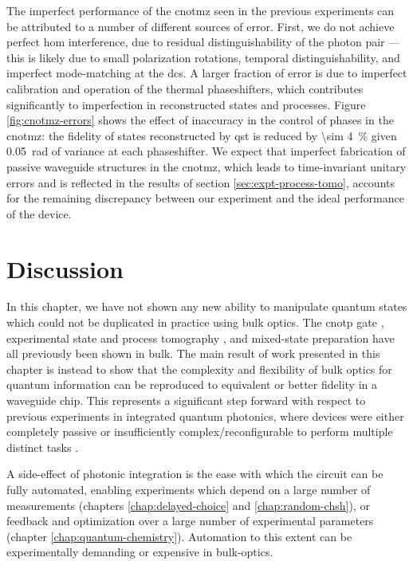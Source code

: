 The imperfect performance of the \gls{cnotmz} seen in the previous experiments can be attributed to a number of different sources of error. First, we do not achieve perfect \gls{hom} interference, due to residual distinguishability of the photon pair --- this is likely due to small polarization rotations, temporal distinguishability, and imperfect mode-matching at the \glspl{dc}. A larger fraction of error is due to imperfect calibration and operation of the thermal phaseshifters, which contributes significantly to imperfection in reconstructed states and processes. Figure \ref{fig:cnotmz-errors} shows the effect of inaccuracy in the control of phases in the \gls{cnotmz}: the fidelity of states reconstructed by \gls{qst} is reduced by \SI{\sim 4}{\percent} given \SI{0.05}{\radian} of variance at each phaseshifter. We expect that imperfect fabrication of passive waveguide structures in the \gls{cnotmz}, which leads to time-invariant unitary errors and is reflected in the results of section \ref{sec:expt-process-tomo}, accounts for the remaining discrepancy between our experiment and the ideal performance of the device.

\section{Discussion}
\label{sec:cnotmz-discussion}
In this chapter, we have not shown any new ability to manipulate quantum states which could not be duplicated in practice using bulk optics.
The \acrshort{cnotp} gate \cite{OBrien2003}, experimental state and process tomography \cite{OBrien2004}, and mixed-state preparation have all previously been shown in bulk. 
The main result of work presented in this chapter is instead to show that the complexity and flexibility of bulk optics for quantum information can be reproduced to equivalent or better fidelity in a waveguide chip. This represents a significant step forward with respect to previous experiments in integrated quantum photonics, where devices were either completely passive \cite{Politi2009, Politi2009a, Peruzzo2011a, Marshall2009, Matthews2011a}
or insufficiently complex/reconfigurable to perform multiple distinct tasks
\cite{Matthews2009, Politi2009}.  

A side-effect of photonic integration is the ease with which the circuit can be fully automated, enabling experiments which depend on a large number of measurements (chapters \ref{chap:delayed-choice} and \ref{chap:random-chsh}), or feedback and optimization over a large number of experimental parameters (chapter \ref{chap:quantum-chemistry}). Automation to this extent can be experimentally demanding or expensive  in bulk-optics.

